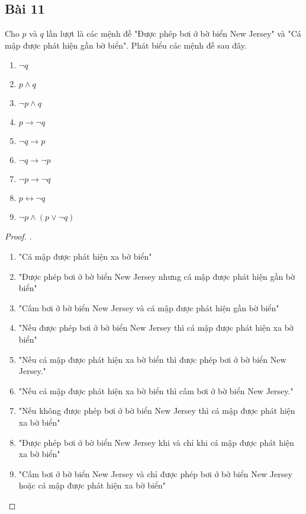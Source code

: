 \subsection*{Bài 11}
Cho $p$ và $q$ lần lượt là các mệnh đề "Được phép bơi ở bờ biển New Jersey" và "Cá mập được phát hiện gần bờ biển". Phát biểu các mệnh đề sau đây.
\begin{multicols}{3}
    \begin{enumerate}[label=\alph*)]
        \item $\neg q$
        \item $p\land q$
        \item $\neg p\land q$
        \item $p\rightarrow\neg q$
        \item $\neg q\rightarrow p$
        \item $\neg q\rightarrow\neg p$
        \item $\neg p\rightarrow\neg q$
        \item $p\leftrightarrow\neg q$
        \item $\neg p\land(p\lor\neg q)$
    \end{enumerate}
\end{multicols}
\begin{proof}.
    \begin{enumerate}[label=\alph*)]
        \item "Cá mập được phát hiện xa bờ biển"
        \item "Được phép bơi ở bờ biển New Jersey nhưng cá mập được phát hiện gần bờ biển"
        \item "Cấm bơi ở bờ biển New Jersey và cá mập được phát hiện gần bờ biển"
        \item "Nếu được phép bơi ở bờ biển New Jersey thì cá mập được phát hiện xa bờ biển"
        \item "Nếu cá mập được phát hiện xa bờ biển thì được phép bơi ở bờ biển New Jersey."
        \item "Nếu cá mập được phát hiện xa bờ biển thì cấm bơi ở bờ biển New Jersey."
        \item "Nếu không được phép bơi ở bờ biển New Jersey thì cá mập được phát hiện xa bờ biển"
        \item "Được phép bơi ở bờ biển New Jersey khi và chỉ khi cá mập được phát hiện xa bờ biển"
        \item "Cấm bơi ở bờ biển New Jersey và chỉ được phép bơi ở bờ biển New Jersey hoặc cá mập được phát hiện xa bờ biển"
    \end{enumerate}
\end{proof}
